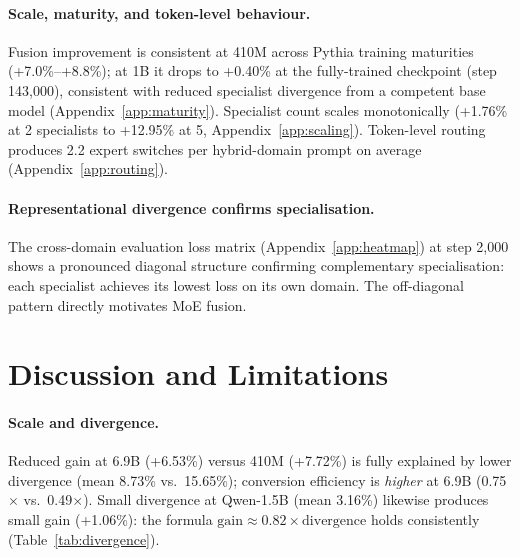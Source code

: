 \documentclass{article}
\begin{document}
\paragraph{Scale, maturity, and token-level behaviour.} Fusion improvement is consistent at 410M across Pythia training maturities (+7.0\%--+8.8\%); at 1B it drops to +0.40\% at the fully-trained checkpoint (step 143,000), consistent with reduced specialist divergence from a competent base model (Appendix~\ref{app:maturity}). Specialist count scales monotonically (+1.76\% at 2 specialists to +12.95\% at 5, Appendix~\ref{app:scaling}). Token-level routing produces 2.2 expert switches per hybrid-domain prompt on average (Appendix~\ref{app:routing}).

\paragraph{Representational divergence confirms specialisation.} The cross-domain evaluation loss matrix (Appendix~\ref{app:heatmap}) at step 2,000 shows a pronounced diagonal structure confirming complementary specialisation: each specialist achieves its lowest loss on its own domain. The off-diagonal pattern directly motivates MoE fusion.

\section{Discussion and Limitations}
\label{sec:discussion}

\paragraph{Scale and divergence.} Reduced gain at 6.9B (+6.53\%) versus 410M (+7.72\%) is fully explained by lower divergence (mean 8.73\% vs.\ 15.65\%); conversion efficiency is \emph{higher} at 6.9B (0.75$\times$ vs.\ 0.49$\times$). Small divergence at Qwen-1.5B (mean 3.16\%) likewise produces small gain (+1.06\%): the formula $\text{gain} \approx 0.82 \times \text{divergence}$ holds consistently (Table~\ref{tab:divergence}).
\end{document}
